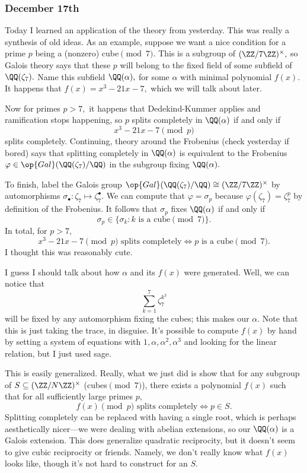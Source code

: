 \subsubsection{December 17th}
Today I learned an application of the theory from yesterday. This was really a synthesis of old ideas. As an example, suppose we want a nice condition for a prime $p$ being a (nonzero) cube$\pmod7.$ This is a subgroup of $(\ZZ/7\ZZ)^\times,$ so Galois theory says that these $p$ will belong to the fixed field of some subfield of $\QQ(\zeta_7).$ Name this subfield $\QQ(\alpha),$ for some $\alpha$ with minimal polynomial $f(x).$ It happens that $f(x)=x^3-21x-7,$ which we will talk about later.

Now for primes $p>7,$ it happens that Dedekind-Kummer applies and ramification stops happening, so $p$ splits completely in $\QQ(\alpha)$ if and only if
\[x^3-21x-7\pmod p\]
splits completely. Continuing, theory around the Frobenius (check yesterday if bored) says that splitting completely in $\QQ(\alpha)$ is equivalent to the Frobenius $\varphi\in\op{Gal}(\QQ(\zeta_7)/\QQ)$ in the subgroup fixing $\QQ(\alpha).$

To finish, label the Galois group $\op{Gal}(\QQ(\zeta_7)/\QQ)\cong(\ZZ/7\ZZ)^\times$ by automorphisms $\sigma_\bullet:\zeta_7\mapsto\zeta_7^\bullet.$ We can compute that $\varphi=\sigma_p$ because $\varphi(\zeta_7)=\zeta_7^p$ by definition of the Frobenius. It follows that $\sigma_p$ fixes $\QQ(\alpha)$ if and only if
\[\sigma_p\in\{\sigma_k:k\text{ is a cube}\pmod7\}.\]
In total, for $p>7,$
\[x^3-21x-7\pmod p\text{ splits completely}\iff p\text{ is a cube}\pmod7.\]
I thought this was reasonably cute.

I guess I should talk about how $\alpha$ and its $f(x)$ were generated. Well, we can notice that
\[\sum_{k=1}^7\zeta_7^{k^3}\]
will be fixed by any automorphism fixing the cubes; this makes our $\alpha.$ Note that this is just taking the trace, in disguise. It's possible to compute $f(x)$ by hand by setting a system of equations with $1,\alpha,\alpha^2,\alpha^3$ and looking for the linear relation, but I just used sage.

This is easily generalized. Really, what we just did is show that for any subgroup of $S\subseteq(\ZZ/N\ZZ)^\times$ (cubes$\pmod7$), there exists a polynomial $f(x)$ such that for all sufficiently large primes $p,$
\[f(x)\pmod p\text{ splits completely}\iff p\in S.\]
Splitting completely can be replaced with having a single root, which is perhaps aesthetically nicer---we were dealing with abelian extensions, so our $\QQ(\alpha)$ is a Galois extension. This does generalize quadratic reciprocity, but it doesn't seem to give cubic reciprocity or friends. Namely, we don't really know what $f(x)$ looks like, though it's not hard to construct for an $S.$

